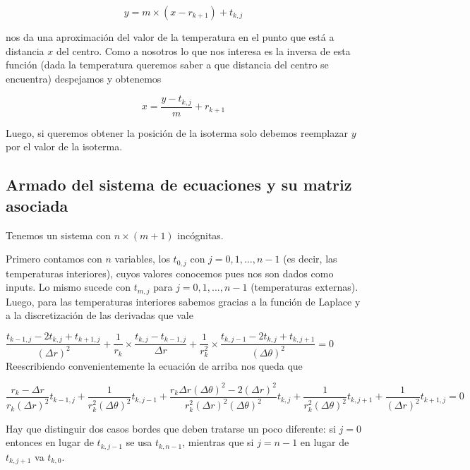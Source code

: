 \begin{equation*}
y = m \times (x - r_{k+1}) + t_{k,j}
\end{equation*}

nos da una aproximación del valor de la temperatura en el punto que está a distancia $x$ del centro. Como a nosotros lo que nos interesa es la inversa de esta función (dada la temperatura queremos saber a que distancia del centro se encuentra) despejamos y obtenemos 

\begin{equation}
x = \dfrac{ y-t_{k,j} } {m} + r_{k+1}
\end{equation}

Luego, si queremos obtener la posición de la isoterma solo debemos reemplazar $y$ por el valor de la isoterma.

  
\subsection{Armado del sistema de ecuaciones y su matriz asociada}
\label{sec:armado-sistema}
Tenemos un sistema con $n\times(m+1)$ incógnitas.

Primero contamos con $n$ variables, los $t_{0,j}$ con $j = 0,1,\hdots, n-1$ (es decir, las temperaturas interiores), cuyos valores conocemos pues nos son dados como inputs. Lo mismo sucede con $t_{m, j}$ para $j = 0,1,..., n-1$ (temperaturas externas).
Luego, para las temperaturas interiores sabemos gracias a la función de Laplace y a la discretización de las derivadas que vale 

$\dfrac{t_{k-1,j} - 2t_{k,j} + t_{k+1,j}}{(\Delta r)^2} 
+ \dfrac{1}{r_k} \times \dfrac{t_{k,j} - t_{k-1,j}}{\Delta r}
+ \dfrac{1}{r_{k}^2} \times \dfrac{t_{k,j-1} -2t_{k,j} + t_{k,j+1}}{(\Delta \theta)^2} = 0$\\

Reescribiendo convenientemente la ecuación de arriba nos queda que 

\begin{equation}
\label{eq:laplace-discreto}
\dfrac{r_k - \Delta r}{r_k (\Delta r)^2} t_{k-1, j} +
\dfrac{1}{r_k^2(\Delta \theta)^2} t_{k, j-1} +
\dfrac{r_k \Delta r (\Delta \theta)^2 - 2(\Delta r)^2}{r_k^2 (\Delta r)^2 (\Delta \theta)^2} t_{k,j} +
\dfrac{1}{r_k^2(\Delta \theta)^2} t_{k, j+1} +
\dfrac{1}{(\Delta r)^2} t_{k+1,j}  = 0
\end{equation}

Hay que distinguir dos casos bordes que deben tratarse un poco diferente: si $j = 0$ entonces en lugar de $t_{k, j-1}$ se usa $t_{k, n-1}$, mientras que si $j = n-1$ en lugar de $t_{k, j+1}$ va $t_{k, 0}$.

